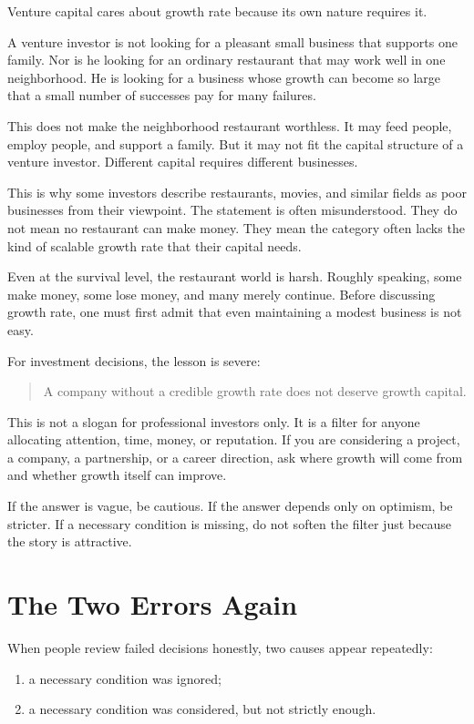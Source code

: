 Venture capital cares about growth rate because its own nature requires it.

A venture investor is not looking for a pleasant small business that supports one family. Nor is he looking for an ordinary restaurant that may work well in one neighborhood. He is looking for a business whose growth can become so large that a small number of successes pay for many failures.

This does not make the neighborhood restaurant worthless. It may feed people, employ people, and support a family. But it may not fit the capital structure of a venture investor. Different capital requires different businesses.

This is why some investors describe restaurants, movies, and similar fields as poor businesses from their viewpoint. The statement is often misunderstood. They do not mean no restaurant can make money. They mean the category often lacks the kind of scalable growth rate that their capital needs.

Even at the survival level, the restaurant world is harsh. Roughly speaking, some make money, some lose money, and many merely continue. Before discussing growth rate, one must first admit that even maintaining a modest business is not easy.

For investment decisions, the lesson is severe:

\begin{quote}
A company without a credible growth rate does not deserve growth capital.
\end{quote}

This is not a slogan for professional investors only. It is a filter for anyone allocating attention, time, money, or reputation. If you are considering a project, a company, a partnership, or a career direction, ask where growth will come from and whether growth itself can improve.

If the answer is vague, be cautious. If the answer depends only on optimism, be stricter. If a necessary condition is missing, do not soften the filter just because the story is attractive.

\section*{The Two Errors Again}

When people review failed decisions honestly, two causes appear repeatedly:

\begin{enumerate}
\item a necessary condition was ignored;
\item a necessary condition was considered, but not strictly enough.
\end{enumerate}

